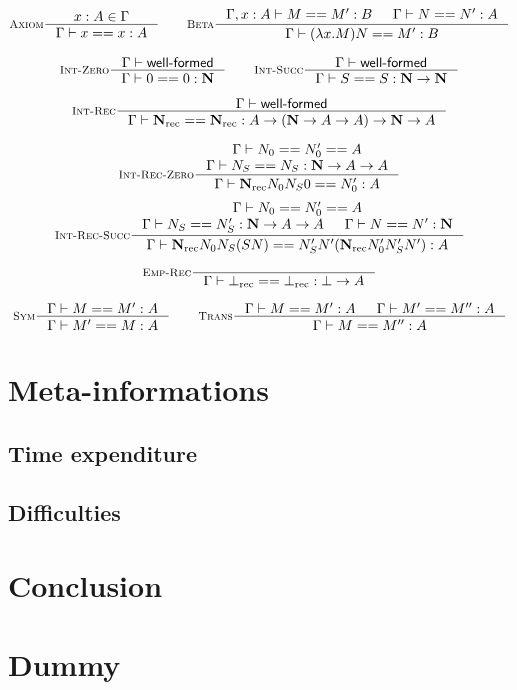 \documentclass{article}
\DeclareMathOperator{\rec}{rec}
\newcommand{\0}{\mathbf{0}}
\newcommand{\1}{\mathbf{1}}
\newcommand{\nat}{\mathbf{N}}
\newcommand{\Wf}{\textsf{well-formed}}
\begin{document}
$$
    \inference[\textsc{Axiom}]{x : A \in \Gamma }{\Gamma |- x == x : A} \qquad
    \inference[\textsc{Beta}]{\Gamma, x : A |- M == M' : B & \Gamma |- N == N' : A}{\Gamma |- (\lambda x. M)N == M' : B}
$$

$$
    \inference[\textsc{Int-Zero}]{\Gamma |- \Wf}{\Gamma |- 0 == 0 : \nat} \qquad
    \inference[\textsc{Int-Succ}]{\Gamma |- \Wf}{\Gamma |- S == S : \nat -> \nat}
$$

$$
    \inference[\textsc{Int-Rec}]{\Gamma |- \Wf}{\Gamma |- \nat_{\rec} == \nat_{\rec} : A \to \left(\nat -> A -> A \right) -> \nat -> A}
$$


$$
    \inference[\textsc{Int-Rec-Zero}]{\Gamma |- N_0 == N'_0 == A\\ \Gamma |- N_S == N_S : \nat -> A  -> A}{\Gamma |- \nat_{\rec} N_0N_S0 == N'_0 : A}
$$
$$
    \inference[\textsc{Int-Rec-Succ}]{\Gamma |- N_0 == N'_0 == A\\ \Gamma |- N_S == N'_S : \nat -> A  -> A & \Gamma |- N == N' :\nat}{\Gamma |- \nat_{\rec} N_0N_S (S N) == N'_S N' (\nat_{\rec}N'_0 N'_S N') : A}
$$


$$
    \inference[\textsc{Emp-Rec}]{}{\Gamma |- \bot_{\rec} == \bot_{\rec} : \bot -> A}
$$

$$
    \inference[\textsc{Sym}]{\Gamma |- M == M' : A}{\Gamma |- M' == M : A} \qquad
    \inference[\textsc{Trans}]
    {\Gamma |- M == M' :A & \Gamma |- M' == M'' : A}{\Gamma |- M == M'' : A}
$$


\section{Meta-informations}

\subsection{Time expenditure}


\subsection{Difficulties}



\section{Conclusion}



\newpage

\appendix
\appendixname

\section{Dummy}

\printbibliography
\end{document}
